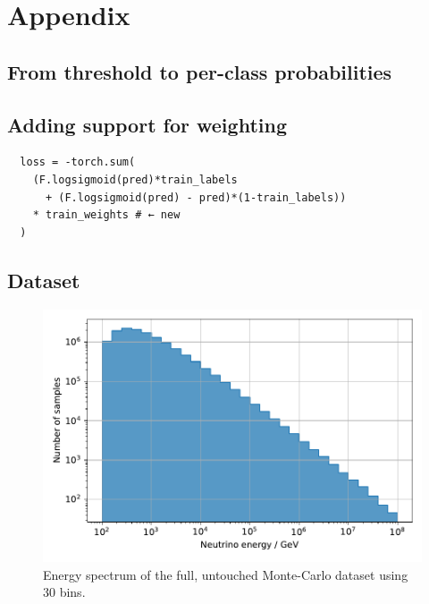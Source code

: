 \chapter{Appendix}
\blindtext

\section{From threshold to per-class probabilities}
\label{sec:appendix:corn_probas}
\blindtext


\section{Adding support for weighting}
\begin{verbatim}
  loss = -torch.sum(
    (F.logsigmoid(pred)*train_labels
      + (F.logsigmoid(pred) - pred)*(1-train_labels))
    * train_weights # ← new
  )
\end{verbatim}


\section{Dataset}
\begin{figure}
    \centering
    \includegraphics[scale=1]{content/plots/dataset:raw:histogram.pdf}
    \caption{Energy spectrum of the full, untouched Monte-Carlo dataset using 30 bins.}
    \label{fig:dataset:raw:histogram}
\end{figure}

